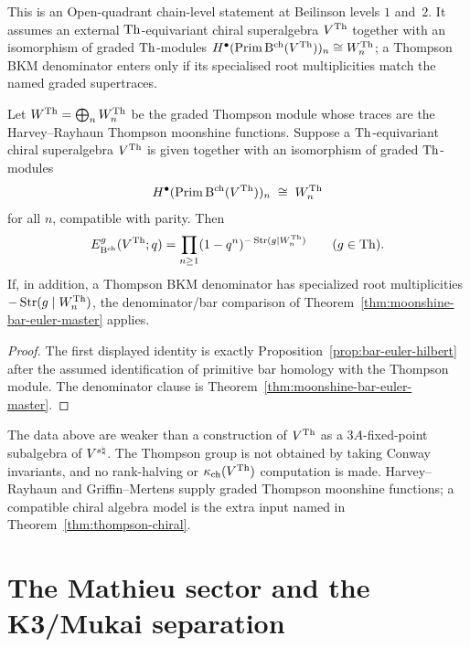 \begin{theorem}
\label{thm:thompson-chiral}
This is an Open-quadrant chain-level statement at Beilinson levels
$1$ and~$2$. It assumes an external $\mathrm{Th}$-equivariant chiral
superalgebra $V^{\mathrm{Th}}$ together with an isomorphism of graded
$\mathrm{Th}$-modules
$H^\bullet(\operatorname{Prim}\mathrm B^{\mathrm{ch}}(V^{\mathrm{Th}}))_n\cong W^{\mathrm{Th}}_n$;
a Thompson BKM denominator enters only if its specialised root
multiplicities match the named graded supertraces.

Let $W^{\mathrm{Th}}=\bigoplus_n W^{\mathrm{Th}}_n$ be the graded Thompson module
whose traces are the Harvey--Rayhaun Thompson moonshine functions.
Suppose a $\mathrm{Th}$-equivariant chiral superalgebra $V^{\mathrm{Th}}$ is given
together with an isomorphism of graded $\mathrm{Th}$-modules
\[
 H^\bullet(\operatorname{Prim}\mathrm B^{\mathrm{ch}}(V^{\mathrm{Th}}))_n
 \;\cong\;
 W^{\mathrm{Th}}_n
\]
for all $n$, compatible with parity.  Then
\[
 E_{\mathrm B^{\mathrm{ch}}}^{g}(V^{\mathrm{Th}};q)
 =
 \prod_{n\geq 1}
 (1-q^n)^{-\operatorname{Str}(g\mid W^{\mathrm{Th}}_n)}
 \qquad(g\in\mathrm{Th}).
\]
If, in addition, a Thompson BKM denominator has specialized root
multiplicities $-\operatorname{Str}(g\mid W^{\mathrm{Th}}_n)$, the denominator/bar
comparison of Theorem~\ref{thm:moonshine-bar-euler-master} applies.
\end{theorem}

\begin{proof}
The first displayed identity is exactly
Proposition~\ref{prop:bar-euler-hilbert} after the assumed
identification of primitive bar homology with the Thompson module.
The denominator clause is Theorem~\ref{thm:moonshine-bar-euler-master}.
\end{proof}

\begin{remark}
\label{rem:thompson-as-conway-subsector}
The data above are weaker than a construction of $V^{\mathrm{Th}}$ as a
$3A$-fixed-point subalgebra of $V^{s\natural}$.  The Thompson group is not
obtained by taking Conway invariants, and no rank-halving or
$\kappa_{\mathrm{ch}}(V^{\mathrm{Th}})$ computation is made.  Harvey--Rayhaun and
Griffin--Mertens supply graded Thompson moonshine functions; a
compatible chiral algebra model is the extra input named in
Theorem~\ref{thm:thompson-chiral}.
\end{remark}

\section{The Mathieu sector and the K3/Mukai separation}
\label{sec:mathieu-k3-link}

